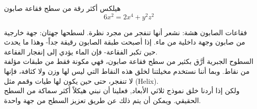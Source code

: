 \begin{surferPage}[هيلكس]{هيلكس}
أكثر رقة من سطح فقاعة صابون\\
  \smallskip
\[6x^2	= 2x^4	+ y^2	z^2\]

\singlespacing
فقاعات الصابون هشة: نشعر أنها تنفجر من مجرد نظرة. لسطحها جهتان: جهة خارجية من صابون وجهة داخلية من ماء. إذا أصبحت طبقة الصابون رقيقة جداً- وهذا ما يحدث حين تكبر الفقاعة- فإن الماء يؤدي إلى إنفجار الفقاعة. \\
\vspace{0,3cm}
السطوح الجبرية أرَّق بكثير من سطح فقاعة صابون، فهي مكونة فقط من طبقات مؤلفة من نقاط. وبما أننا نستخدم مخيلتنا لخلق هذه النقاط التي ليس لها وزن ولا كثافة، فإنها لا تنفجر، حتى حين يكون لها طيات وقمم مثل \textenglish{(Helix)}.\\
\vspace{0,3cm}
ولكن إذا أردنا خلق نموذج ثلاثي الأبعاد, فعلينا أن نبني هيكلاً أكثر سماكة من السطح الحقيقي. ويمكن أن يتم ذلك عن طريق تعزيز السطح من جهة واحدة.
\end{surferPage}

